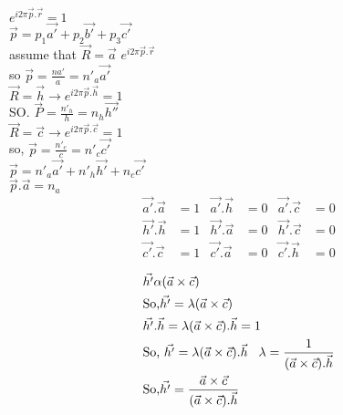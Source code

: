 \documentclass[11]{article}
\begin{document}
\begin{titlepage}
\begin{itemize}
$e^{i 2 \pi \vec{p}. \vec{r}}=1$\\

$ \vec{p}=p_{1} \vec{a'}+p_{2} \vec{b'}+p_{3} \vec{c'}$\\

assume that $ \vec{R}= \vec{a}$
$e^{i 2 \pi \vec{p}. \vec{r}}$\\

so $ \vec{p}=\frac{na'}{a}=n'_{a} \vec{a'}$\\

$ \vec{R}= \vec{h} \rightarrow e^{i 2 \pi \vec{p}. \vec{h}}=1$\\

SO. $ \vec{P}=\frac{n'_{h}}{h}=n_{h} \vec{h''}$\\

 $ \vec{R}= \vec{c} \rightarrow e^{i 2 \pi \vec{p}. \vec{c}}=1$\\
 
 so, $ \vec{p}= \frac{n'_{c}}{c}=n'_{c} \vec{c'}$\\
 
 $\vec{p}=n'_{a} \vec{a'}+n'_{h} \vec{h'}+n_{c} \vec{c'}$\\
 
$\vec{p}. \vec{a}= n_{a}$\\ 
 
 \begin{align*}
\vec{a'}.\vec{a} & =1  & \vec{a'}.\vec{h} & =0 & \vec{a'}.\vec{c} & =0\\
\vec{h'}.\vec{h} & =1 & \vec{h'}.\vec{a} & =0 & \vec{h'}.\vec{c} & =0\\
\vec{c'}.\vec{c} & =1 & \vec{c'}.\vec{a} & =0 & \vec{c'}.\vec{h} & =0
 \end{align*}
 
 \newpage
 \begin{center}
 \begin{eqnarray*}
& \vec{h'} \alpha (\vec{a} \times \vec{c})\\
& \mbox{So,} \vec{h'}= \lambda ( \vec{a} \times \vec{c})\\
& \vec{h'}. \vec{h}= \lambda ( \vec{a} \times \vec{c}). \vec{h} =1\\
& \mbox{So, } \vec{h'}=\lambda ( \vec{a} \times \vec{c}). \vec{h} \hspace{3mm} \lambda =\frac{1}{(\vec{a} \times \vec{c}). \vec{h}}\\
& \mbox{So,} \vec{h'}=\frac{\vec{a} \times \vec{c}}{(\vec{a} \times \vec{c}). \vec{h}} 
 \end{eqnarray*}
 \end{center}
 

\end{itemize}
\end{titlepage}
\end{document}
